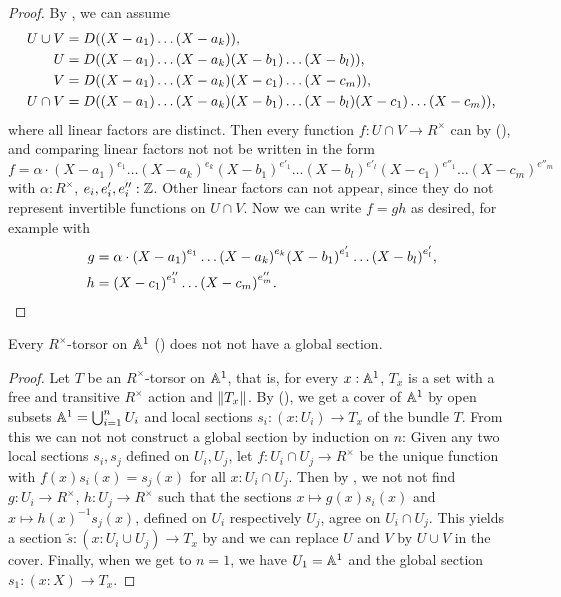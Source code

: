 \begin{proof}
  By ,
  we can assume
  \begin{align*}
    U \cup V &= D((X - a_1) \dots (X - a_k)) \rlap{,}\\
    U &= D((X - a_1) \dots (X - a_k) (X - b_1) \dots (X - b_l)) \rlap{,}\\
    V &= D((X - a_1) \dots (X - a_k) (X - c_1) \dots (X - c_m)) \rlap{,}\\
    U \cap V &= D((X - a_1) \dots (X - a_k) (X - b_1) \dots (X - b_l) (X - c_1) \dots (X - c_m))
    \rlap{,}
  \end{align*}
  where all linear factors are distinct.
  Then every function $f : U \cap V \to R^\times$ can
  by (), 
  and comparing linear factors
  not not be written in the form
  \[ f = \alpha \cdot
     {(X - a_1)}^{e_1} \dots {(X - a_k)}^{e_k}
     {(X - b_1)}^{e'_1} \dots {(X - b_l)}^{e'_l}
     {(X - c_1)}^{e''_1} \dots {(X - c_m)}^{e''_m}
  \]
  with $\alpha : R^\times$, $e_i, e'_i, e''_i : \mathbb{Z}$.
  Other linear factors can not appear,
  since they do not represent invertible functions on $U \cap V$.
  Now we can write $f = gh$ as desired,
  for example with
  \begin{align*}
    g &= \alpha \cdot
    {(X - a_1)}^{e_1} \dots {(X - a_k)}^{e_k}
    {(X - b_1)}^{e'_1} \dots {(X - b_l)}^{e'_l} \rlap{,}\\
    h &=
    {(X - c_1)}^{e''_1} \dots {(X - c_m)}^{e''_m} \rlap{.}
  \end{align*}
\end{proof}

\begin{theorem}%
  \label{Gm-torsors-on-A1}
  Every $R^\times$-torsor on $\mathbb{A}^1$ ()
  does not not have a global section.
\end{theorem}

\begin{proof}
  Let $T$ be an $R^\times$-torsor on $\mathbb{A}^1$,
  that is,
  for every $x : \mathbb{A}^1$,
  $T_x$ is a set with a free and transitive $R^\times$ action
  and $\lVert T_x \rVert$.
  By (),
  we get a cover of $\mathbb{A}^1$ by open subsets $\mathbb{A}^1 = \bigcup_{i = 1}^n U_i$
  and local sections $s_i : (x : U_i) \to T_x$ of the bundle $T$.
  From this we can not not construct a global section by induction on $n$:
  Given any two local sections $s_i, s_j$ defined on $U_i, U_j$,
  let $f : U_i \cap U_j \to R^\times$ be the unique function with
  $f(x)s_i(x) = s_j(x)$ for all $x : U_i \cap U_j$.
  Then by ,
  we not not find $g : U_i \to R^\times$, $h : U_j \to R^\times$
  such that the sections
  $x \mapsto g(x)s_i(x)$ and $x \mapsto {h(x)}^{-1}s_j(x)$,
  defined on $U_i$ respectively $U_j$,
  agree on $U_i \cap U_j$.
  This yields a section $\widetilde{s} : (x : U_i \cup U_j) \to T_x$
  by 
  and we can replace $U$ and $V$ by $U \cup V$ in the cover.
  Finally, when we get to $n = 1$,
  we have $U_1 = \mathbb{A}^1$
  and the global section $s_1 : (x : X) \to T_x$.
\end{proof}

